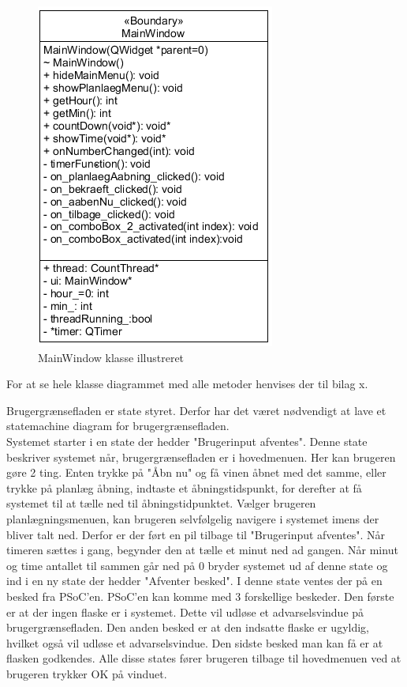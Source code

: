\begin{figure}[H]
	\centerline{\includegraphics[scale=1]{tex/Design/GUI/Fotos/MainWindow}}
	\caption{MainWindow klasse illustreret}
	\label{MW_CD}
\end{figure}

For at se hele klasse diagrammet med alle metoder henvises der til bilag x.

Brugergrænsefladen er state styret. Derfor har det været nødvendigt at lave et statemachine diagram for brugergrænsefladen.\\

Systemet starter i en state der hedder "Brugerinput afventes". Denne state beskriver systemet når, brugergrænsefladen er i hovedmenuen. Her kan brugeren gøre 2 ting. Enten trykke på "Åbn nu" og få vinen åbnet med det samme, eller trykke på planlæg åbning, indtaste et åbningstidspunkt, for derefter at få systemet til at tælle ned til åbningstidpunktet. Vælger brugeren planlægningsmenuen, kan brugeren selvfølgelig navigere i systemet imens der bliver talt ned. Derfor er der ført en pil tilbage til "Brugerinput afventes". Når timeren sættes i gang, begynder den at tælle et minut ned ad gangen. Når minut og time antallet til sammen går ned på 0 bryder systemet ud af denne state og ind i en ny state der hedder "Afventer besked". I denne state ventes der på en besked fra PSoC'en. PSoC'en kan komme med 3 forskellige beskeder. Den første er at der ingen flaske er i systemet. Dette vil udløse et advarselsvindue på brugergrænsefladen. Den anden besked er at den indsatte flaske er ugyldig, hvilket også vil udløse et advarselsvindue. Den sidste besked man kan få er at flasken godkendes. Alle disse states fører brugeren tilbage til hovedmenuen ved at brugeren trykker OK på vinduet.
